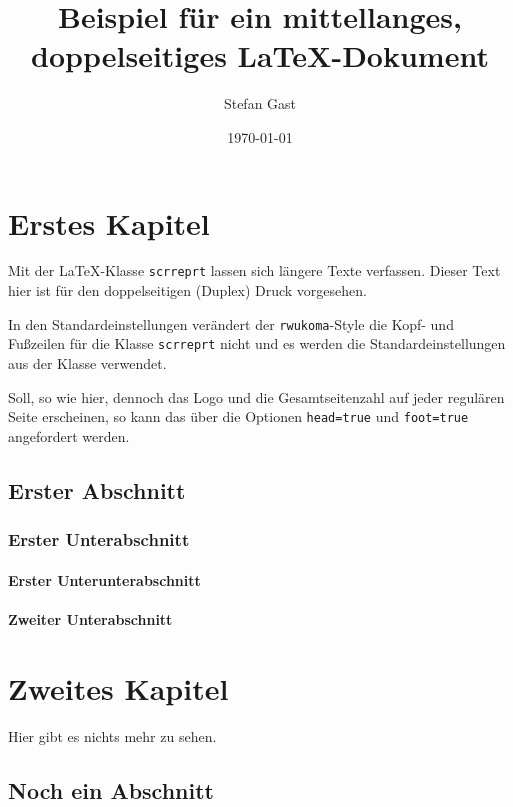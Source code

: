 \documentclass[twoside]{scrreprt}
\title{Beispiel für ein mittellanges, doppelseitiges \LaTeX-Dokument}
\author{Stefan Gast}
\date{\today}
\begin{document}
	\maketitle
	\tableofcontents

	\chapter{Erstes Kapitel}

		Mit der \LaTeX-Klasse \verb?scrreprt? lassen sich längere Texte
		verfassen.
		Dieser Text hier ist für den doppelseitigen (Duplex) Druck
		vorgesehen.

		In den Standardeinstellungen verändert der \verb?rwukoma?-Style
		die Kopf- und Fußzeilen für die Klasse \verb?scrreprt? nicht
		und es werden die Standardeinstellungen aus der Klasse verwendet.

		Soll, so wie hier, dennoch das Logo und die Gesamtseitenzahl
		auf jeder regulären Seite erscheinen, so kann das über die
		Optionen \verb?head=true? und \verb?foot=true? angefordert werden.

		\section{Erster Abschnitt}

			\lipsum[1]

			\subsection{Erster Unterabschnitt}

				\lipsum[2]

				\subsubsection{Erster Unterunterabschnitt}

					\lipsum[2-5]

				\subsubsection{Zweiter Unterabschnitt}

					\lipsum[6-12]

	\chapter{Zweites Kapitel}

		Hier gibt es nichts mehr zu sehen.

		\section{Noch ein Abschnitt}

			\lipsum
\end{document}
